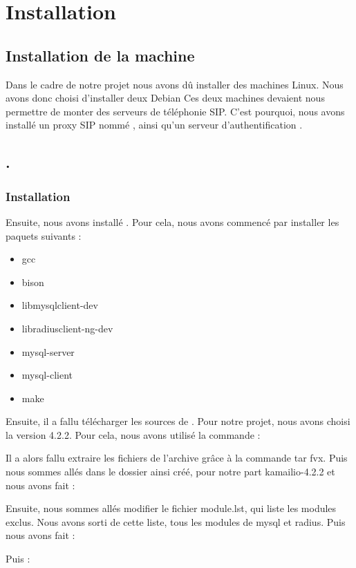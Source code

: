 \section{Installation}
\subsection{Installation de la machine}
Dans le cadre de notre projet nous avons dû installer des machines Linux. Nous avons donc choisi d'installer deux Debian \todo
Ces deux machines devaient nous permettre de monter des serveurs de téléphonie SIP.
C'est pourquoi, nous avons installé un proxy SIP nommé \kam, ainsi qu'un serveur d'authentification \frad.
\subsection{\kam.}
\subsubsection{Installation}
Ensuite, nous avons installé \kam.
Pour cela, nous avons commencé par installer les paquets suivants :
\begin{itemize}
	\item{gcc}
	\item{bison}
	\item{libmysqlclient-dev}
	\item{libradiusclient-ng-dev}
	\item{mysql-server}
	\item{mysql-client}
	\item{make}
\end{itemize}
Ensuite, il a fallu télécharger les sources de \kam. Pour notre projet, nous avons choisi la version 4.2.2.
Pour cela, nous avons utilisé la commande :


Il a alors fallu extraire les fichiers de l'archive grâce à la commande tar fvx.
Puis nous sommes allés dans le dossier ainsi créé, pour notre part kamailio-4.2.2 et nous avons fait :


Ensuite, nous sommes allés modifier le fichier module.lst, qui liste les modules exclus.
Nous avons sorti de cette liste, tous les modules de mysql et radius.
Puis nous avons fait : 
	

Puis :


